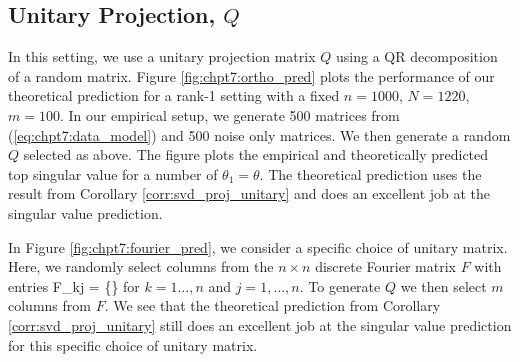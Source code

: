 \subsection{Unitary Projection, $Q$}

In this setting, we use a unitary projection matrix $Q$ using a QR decomposition of a
random matrix. Figure \ref{fig:chpt7:ortho_pred} plots the performance of our theoretical
prediction for a rank-1 setting with a fixed $n=1000$, $N=1220$, $m=100$. In our empirical
setup, we generate 500 matrices from (\ref{eq:chpt7:data_model}) and 500 noise only
matrices. We then generate a random $Q$ selected as above. The figure plots the empirical
and theoretically predicted top singular value for a number of $\theta_1=\theta$. The
theoretical prediction uses the result from Corollary \ref{corr:svd_proj_unitary} and does
an excellent job at the singular value prediction.

In Figure \ref{fig:chpt7:fourier_pred}, we consider a specific choice of unitary
matrix. Here, we randomly select columns from the $n\times n$ discrete Fourier matrix $F$
with entries  
\beq\label{eq:chpt7:fourier}
F_{kj} = \exp\left\{\right\}
\eeq
for $k=1\dots,n$ and $j=1,\dots,n$. To generate $Q$ we then select $m$ columns from
$F$. We see that the theoretical prediction from Corollary \ref{corr:svd_proj_unitary}
still does an excellent job at the singular value prediction for this specific choice of
unitary matrix. 


